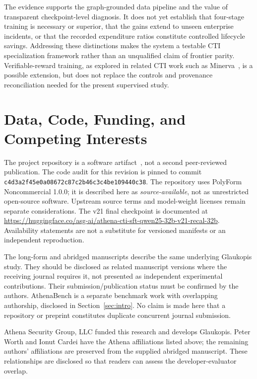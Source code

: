 \documentclass[journal]{IEEEtran}
\newcommand{\code}[1]{{\small\nolinkurl{#1}}}
\begin{document}
The evidence supports the graph-grounded data pipeline and the value of transparent checkpoint-level diagnosis. It does not yet establish that four-stage training is necessary or superior, that the gains extend to unseen enterprise incidents, or that the recorded expenditure ratios constitute controlled lifecycle savings. Addressing these distinctions makes the system a testable CTI specialization framework rather than an unqualified claim of frontier parity. Verifiable-reward training, as explored in related CTI work such as Minerva~\cite{alam2026minerva}, is a possible extension, but does not replace the controls and provenance reconciliation needed for the present supervised study.

\section*{Data, Code, Funding, and Competing Interests}
The project repository is a software artifact~\cite{glaukopis2026software}, not a second peer-reviewed publication. The code audit for this revision is pinned to commit \code{c4d3a2f45e0a08672c87c2b46c3c4be109440c38}. The repository uses PolyForm Noncommercial 1.0.0; it is described here as \emph{source-available}, not as unrestricted open-source software. Upstream source terms and model-weight licenses remain separate considerations. The v21 final checkpoint is documented at \url{https://huggingface.co/asg-ai/athena-cti-sft-qwen25-32b-v21-recal-32b}. Availability statements are not a substitute for versioned manifests or an independent reproduction.

The long-form and abridged manuscripts describe the same underlying Glaukopis study. They should be disclosed as related manuscript versions where the receiving journal requires it, not presented as independent experimental contributions. Their submission/publication status must be confirmed by the authors. AthenaBench is a separate benchmark work with overlapping authorship, disclosed in Section~\ref{sec:intro}. No claim is made here that a repository or preprint constitutes duplicate concurrent journal submission.

Athena Security Group, LLC funded this research and develops Glaukopis. Peter Worth and Ionut Cardei have the Athena affiliations listed above; the remaining authors' affiliations are preserved from the supplied abridged manuscript. These relationships are disclosed so that readers can assess the developer-evaluator overlap.
\end{document}
